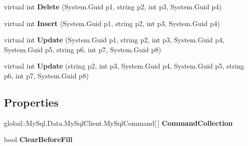 \begin{DoxyCompactItemize}
\item 
virtual int {\bfseries Delete} (System.\+Guid p1, string p2, int p3, System.\+Guid p4)\hypertarget{class_products_1_1_data_1_1ds_sage_table_adapters_1_1ta_tour_a3ea4990c78421a647ceea6c86fc659c1}{}\label{class_products_1_1_data_1_1ds_sage_table_adapters_1_1ta_tour_a3ea4990c78421a647ceea6c86fc659c1}

\item 
virtual int {\bfseries Insert} (System.\+Guid p1, string p2, int p3, System.\+Guid p4)\hypertarget{class_products_1_1_data_1_1ds_sage_table_adapters_1_1ta_tour_a3631d825a745e976586d5a6f6a18c4e4}{}\label{class_products_1_1_data_1_1ds_sage_table_adapters_1_1ta_tour_a3631d825a745e976586d5a6f6a18c4e4}

\item 
virtual int {\bfseries Update} (System.\+Guid p1, string p2, int p3, System.\+Guid p4, System.\+Guid p5, string p6, int p7, System.\+Guid p8)\hypertarget{class_products_1_1_data_1_1ds_sage_table_adapters_1_1ta_tour_a4c3ee0070544380542f1c8eb49b75ad0}{}\label{class_products_1_1_data_1_1ds_sage_table_adapters_1_1ta_tour_a4c3ee0070544380542f1c8eb49b75ad0}

\item 
virtual int {\bfseries Update} (string p2, int p3, System.\+Guid p4, System.\+Guid p5, string p6, int p7, System.\+Guid p8)\hypertarget{class_products_1_1_data_1_1ds_sage_table_adapters_1_1ta_tour_a6d04eea6cd18155b38e2c5b4e4f94416}{}\label{class_products_1_1_data_1_1ds_sage_table_adapters_1_1ta_tour_a6d04eea6cd18155b38e2c5b4e4f94416}

\end{DoxyCompactItemize}
\subsection*{Properties}
\begin{DoxyCompactItemize}
\item 
global\+::\+My\+Sql.\+Data.\+My\+Sql\+Client.\+My\+Sql\+Command\mbox{[}$\,$\mbox{]} {\bfseries Command\+Collection}\hypertarget{class_products_1_1_data_1_1ds_sage_table_adapters_1_1ta_tour_ab170665c2f54286bc884ca651ca786ab}{}\label{class_products_1_1_data_1_1ds_sage_table_adapters_1_1ta_tour_ab170665c2f54286bc884ca651ca786ab}

\item 
bool {\bfseries Clear\+Before\+Fill}\hypertarget{class_products_1_1_data_1_1ds_sage_table_adapters_1_1ta_tour_ad9ebd3d6933025c50e16e575363c9e46}{}\label{class_products_1_1_data_1_1ds_sage_table_adapters_1_1ta_tour_ad9ebd3d6933025c50e16e575363c9e46}

\end{DoxyCompactItemize}


